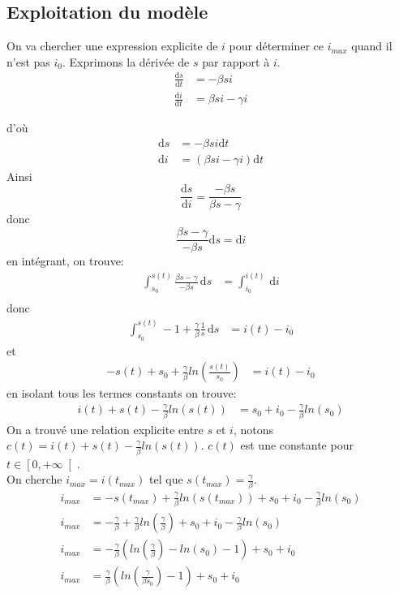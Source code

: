 \documentclass[a4paper]{article}
\theoremstyle{plain}
\theoremstyle{definition}
\theoremstyle{remark}
\begin{document}
  \subsection{Exploitation du modèle}
    On va chercher une expression explicite de $i$ pour déterminer ce $i_{max}$ quand il n'est pas $i_0$.
   Exprimons la dérivée de $s$ par rapport à $i$. 
    \begin{align*}
    \frac{\mathrm{d}s}{\mathrm{d}t} &= -\beta si\\
    \frac{\mathrm{d}i}{\mathrm{d}t} &= \beta si -\gamma i
    \end{align*}

    d'où 
     \begin{align*}
    \mathrm{d}s &= -\beta si \mathrm{d}t\\
    \mathrm{d}i &= \left(\beta si -\gamma i \right)\mathrm{d}t
    \end{align*}
   Ainsi 
   $$ \frac{\mathrm{d}s}{\mathrm{d}i}=\frac{-\beta s}{\beta s-\gamma}$$
   donc
   $$ \frac{\beta s-\gamma}{-\beta s}\mathrm{d}s=\mathrm{d}i$$
   en intégrant, on trouve:
    \begin{align*}
   \int_{s_0}^{s(t)} \frac{\beta s-\gamma}{-\beta s} \, \mathrm{d}s&=\int_{i_0}^{i(t)}\, \mathrm{d}i \\
   \end{align*}
   donc
   \begin{align*}
    \int_{s_0}^{s(t)} -1+\frac{\gamma}{\beta}\frac{1}{s}\, \mathrm{d}s&=i(t)-i_0 
     \end{align*}
    et
    \begin{align*}
        -s(t)+s_0+\frac{\gamma}{\beta}ln(\frac{s(t)}{s_0})&=i(t)-i_0
    \end{align*}
    en isolant tous les termes constants on trouve: 
    \begin{align*}    i(t)+s(t)-\frac{\gamma}{\beta}ln(s(t))&=s_0+i_0-\frac{\gamma}{\beta}ln(s_0)
   \end{align*}
   On a trouvé une relation explicite entre $s$ et $i$, notons $c(t)=i(t)+s(t)-\frac{\gamma}{\beta}ln(s(t))$. $c(t)$ est une constante pour $t\in\left[0,+\infty\right[$. \\
   On cherche $i_{max}=i(t_{max})$ tel que $s(t_{max})=\frac{\gamma}{\beta}$.
   \begin{align*}
    i_{max}&=-s(t_{max})+\frac{\gamma}{\beta}ln(s(t_{max}))+s_0+i_0-\frac{\gamma}{\beta}ln(s_0)\\
   i_{max}&=-\frac{\gamma}{\beta}+\frac{\gamma}{\beta}ln(\frac{\gamma}{\beta})+s_0+i_0-\frac{\gamma}{\beta}ln(s_0)\\
   i_{max}&=-\frac{\gamma}{\beta}(ln(\frac{\gamma}{\beta})-ln(s_0)-1)+s_0+i_0\\
   i_{max}&=\frac{\gamma}{\beta}(ln(\frac{\gamma}{\beta s_0})-1)+s_0+i_0\\
   \end{align*}
  \newpage
\end{document}
